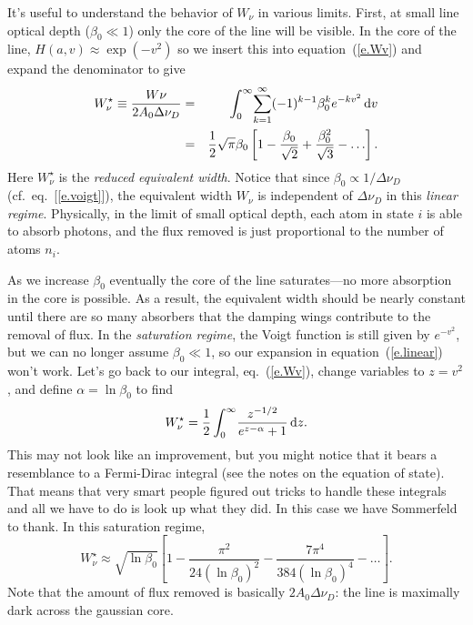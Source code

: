 It's useful to understand the behavior of $W_{\nu}$ in various limits.  
First, at small line optical depth ($\beta_{0}\ll 1$) only the core of the line will be visible. In the core of the line, $H(a,v) \approx \exp(-v^{2})$ so we insert this into equation~(\ref{e.Wv}) and expand the denominator to give
\begin{eqnarray}\label{e.linear}
W_{\nu}^{\star} \equiv \frac{W{\nu}}{2A_{0}\Delta\nu_{D}} &=& \int_{0}^{\infty} \!\sum_{k=1}^{\infty}(-1)^{k-1}\beta_{0}^{k}e^{-kv^{2}}\,\mathrm{d} v\nonumber\\
 &=& \frac{1}{2}\sqrt{\pi}\beta_{0}\left[1-\frac{\beta_{0}}{\sqrt{2}} + \frac{\beta_{0}^{2}}{\sqrt{3}} - \ldots\right].
\end{eqnarray}
Here $W_{\nu}^{\star}$ is the \emph{reduced equivalent width}.
Notice that since $\beta_{0}\propto 1/\Delta\nu_{D}$ (cf.~eq.~[\ref{e.voigt}]), the equivalent width $W_{\nu}$ is independent of $\Delta\nu_{D}$ in this \emph{linear regime}.
Physically, in the limit of small optical depth, each atom in state $i$ is able to absorb photons, and the flux removed  is just proportional to the number of atoms $n_{i}$.

As we increase $\beta_{0}$ eventually the core of the line saturates---no more absorption in the core is possible.  As a result, the equivalent width should be nearly constant until there are so many absorbers that the damping wings contribute to the removal of flux.  In the \emph{saturation regime}, the Voigt function is still given by $e^{-v^{2}}$, but we can no longer assume $\beta_{0}\ll 1$, so our expansion in equation~(\ref{e.linear}) won't work. Let's go back to our integral, eq.~(\ref{e.Wv}), change variables to $z= v^{2}$, and define $\alpha = \ln\beta_{0}$ to find
\[
W_{\nu}^{\star} = \frac{1}{2}\int_{0}^{\infty}\!\frac{z^{-1/2}}{e^{z-\alpha}+1}\,\mathrm{d} z.
\]
This may not look like an improvement, but you might notice that it bears a resemblance to a Fermi-Dirac integral (see the notes on the equation of state). That means that very smart people figured out tricks to handle these integrals and all we have to do is look up what they did.  In this case we have Sommerfeld to thank. In this saturation regime,
\begin{equation}\label{e.saturation}
W_{\nu}^{\star} \approx \sqrt{\ln\beta_{0}}\left[ 1 - \frac{\pi^{2}}{24(\ln\beta_{0})^{2}} - \frac{7\pi^{4}}{384(\ln\beta_{0})^{4}}-\ldots\right].
\end{equation}
Note that the amount of flux removed is basically $2A_{0}\Delta\nu_{D}$: the line is maximally dark across the gaussian core.

